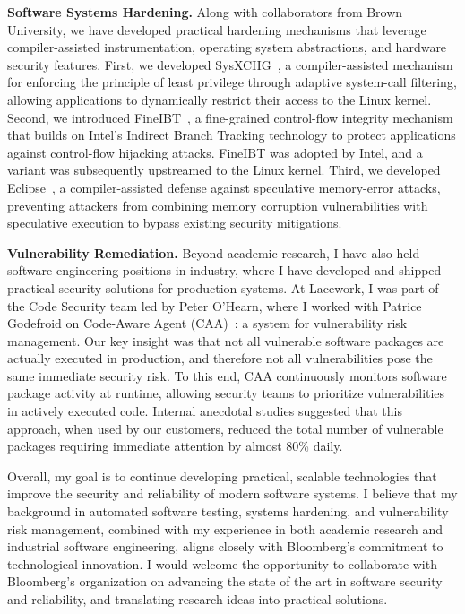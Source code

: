 \documentclass[letterpaper,single,8pt]{article}
\begin{document}
\textbf{Software Systems Hardening.} Along with collaborators from Brown University, we have developed practical hardening mechanisms that leverage compiler-assisted instrumentation, operating system abstractions, and hardware security features. First, we developed SysXCHG~\cite{sysxchg}, a compiler-assisted mechanism for enforcing the principle of least privilege through adaptive system-call filtering, allowing applications to dynamically restrict their access to the Linux kernel. Second, we introduced FineIBT~\cite{fineibt}, a fine-grained control-flow integrity mechanism that builds on Intel's Indirect Branch Tracking technology to protect applications against control-flow hijacking attacks. FineIBT was adopted by Intel, and a variant was subsequently upstreamed to the Linux kernel. Third, we developed Eclipse~\cite{eclipse}, a compiler-assisted defense against speculative memory-error attacks, preventing attackers from combining memory corruption vulnerabilities with speculative execution to bypass existing security mitigations.

\textbf{Vulnerability Remediation.} Beyond academic research, I have also held software engineering positions in industry, where I have developed and shipped practical security solutions for production systems. At Lacework, I was part of the Code Security team led by Peter O'Hearn, where I worked with Patrice Godefroid on Code-Aware Agent (CAA)~\cite{caa}: a system for vulnerability risk management. Our key insight was that not all vulnerable software packages are actually executed in production, and therefore not all vulnerabilities pose the same immediate security risk. To this end, CAA continuously monitors software package activity at runtime, allowing security teams to prioritize vulnerabilities in actively executed code. Internal anecdotal studies suggested that this approach, when used by our customers, reduced the total number of vulnerable packages requiring immediate attention by almost 80\% daily.

\enlargethispage{2\baselineskip}
Overall, my goal is to continue developing practical, scalable technologies that improve the security and reliability of modern software systems. I believe that my background in automated software testing, systems hardening, and vulnerability risk management, combined with my experience in both academic research and industrial software engineering, aligns closely with Bloomberg's commitment to technological innovation. I would welcome the opportunity to collaborate with Bloomberg's organization on advancing the state of the art in software security and reliability, and translating research ideas into practical solutions.

\pagebreak


\end{document}
